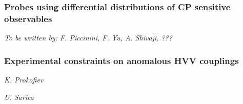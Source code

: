 \subsubsection{Probes using differential distributions of CP sensitive observables}
\begin{center}{\it To be written by: F. Piccinini, F. Yu, A. Shivaji, ???} \end{center}


\subsubsection{Experimental constraints on anomalous HVV couplings}
\label{subsection:ACHVVdecay}
\begin{center}{\it K. Prokofiev} \end{center}


\begin{center}{\it U. Sarica} \end{center}

